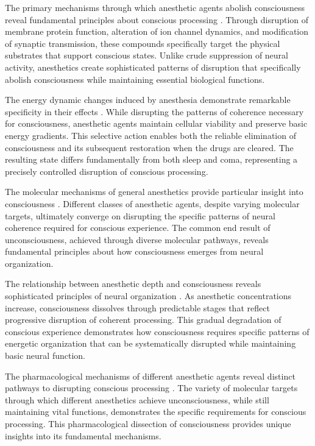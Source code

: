 \begin{refsection}
The primary mechanisms through which anesthetic agents abolish consciousness reveal fundamental principles about conscious processing \cite{Franks2008}. Through disruption of membrane protein function, alteration of ion channel dynamics, and modification of synaptic transmission, these compounds specifically target the physical substrates that support conscious states. Unlike crude suppression of neural activity, anesthetics create sophisticated patterns of disruption that specifically abolish consciousness while maintaining essential biological functions.

The energy dynamic changes induced by anesthesia demonstrate remarkable specificity in their effects \cite{Brown2010}. While disrupting the patterns of coherence necessary for consciousness, anesthetic agents maintain cellular viability and preserve basic energy gradients. This selective action enables both the reliable elimination of consciousness and its subsequent restoration when the drugs are cleared. The resulting state differs fundamentally from both sleep and coma, representing a precisely controlled disruption of conscious processing.

The molecular mechanisms of general anesthetics provide particular insight into consciousness \cite{John2005}. Different classes of anesthetic agents, despite varying molecular targets, ultimately converge on disrupting the specific patterns of neural coherence required for conscious experience. The common end result of unconsciousness, achieved through diverse molecular pathways, reveals fundamental principles about how consciousness emerges from neural organization.

The relationship between anesthetic depth and consciousness reveals sophisticated principles of neural organization \cite{Sanders2012}. As anesthetic concentrations increase, consciousness dissolves through predictable stages that reflect progressive disruption of coherent processing. This gradual degradation of conscious experience demonstrates how consciousness requires specific patterns of energetic organization that can be systematically disrupted while maintaining basic neural function.

The pharmacological mechanisms of different anesthetic agents reveal distinct pathways to disrupting conscious processing \cite{Uhrig2018}. The variety of molecular targets through which different anesthetics achieve unconsciousness, while still maintaining vital functions, demonstrates the specific requirements for conscious processing. This pharmacological dissection of consciousness provides unique insights into its fundamental mechanisms.


\end{refsection}
